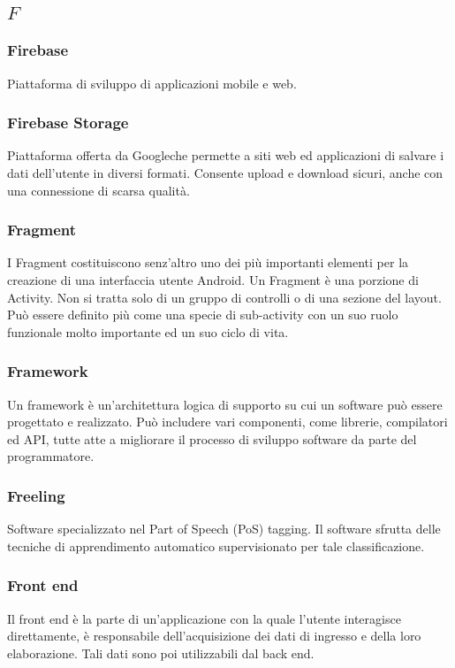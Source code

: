 \subsection*{\quad$F\quad$}
\subsubsection*{Firebase}
Piattaforma di sviluppo di applicazioni mobile e web.

\subsubsection*{Firebase Storage}
Piattaforma offerta da Google\glosp che permette a siti web ed applicazioni di salvare i dati dell'utente in diversi formati. Consente upload e download sicuri, anche con una connessione di scarsa qualità.

\subsubsection*{Fragment}
I Fragment costituiscono senz'altro uno dei più importanti elementi per la creazione di una interfaccia utente Android. Un Fragment è una porzione di Activity\glo. Non si tratta solo di un gruppo di controlli o di una sezione del layout. Può essere definito più come una specie di sub-activity con un suo ruolo funzionale molto importante ed un suo ciclo di vita. 

\subsubsection*{Framework}
Un framework è un'architettura logica di supporto su cui un software può essere progettato e realizzato. Può includere vari componenti, come librerie, compilatori ed API\glo, tutte atte a migliorare il processo di sviluppo software da parte del programmatore.

\subsubsection*{Freeling}
Software specializzato nel Part of Speech (PoS) tagging\glo. Il software sfrutta delle tecniche di apprendimento automatico supervisionato per tale classificazione.  

\subsubsection*{Front end}
Il front end è la parte di un'applicazione con la quale l'utente interagisce direttamente, è responsabile dell'acquisizione dei dati di ingresso e della loro elaborazione. Tali dati sono poi utilizzabili dal back end\glo. 

